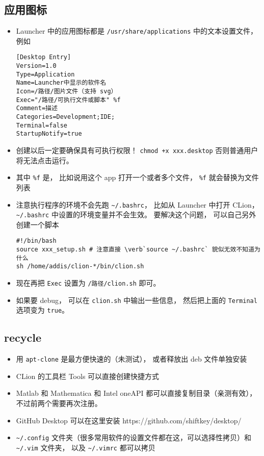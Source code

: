 \subsection{应用图标}
\begin{itemize}
\item Launcher 中的应用图标都是 \verb|/usr/share/applications| 中的文本设置文件， 例如
\begin{lstlisting}[language=none,caption=xxx.desktop]
[Desktop Entry]
Version=1.0
Type=Application
Name=Launcher中显示的软件名
Icon=/路径/图片文件（支持 svg）
Exec="/路径/可执行文件或脚本" %f
Comment=描述
Categories=Development;IDE;
Terminal=false
StartupNotify=true
\end{lstlisting}
\item 创建以后一定要确保具有可执行权限！ \verb|chmod +x xxx.desktop| 否则普通用户将无法点击运行。
\item 其中 \verb|%f| 是， 比如说用这个 app 打开一个或者多个文件， \verb|%f| 就会替换为文件列表
\item 注意执行程序的环境不会先跑 \verb|~/.bashrc|， 比如从 Launcher 中打开 CLion， \verb|~/.bashrc| 中设置的环境变量并不会生效。 要解决这个问题， 可以自己另外创建一个脚本
\begin{lstlisting}[language=none,caption=clion.sh]
#!/bin/bash
source xxx_setup.sh # 注意直接 \verb`source ~/.bashrc` 貌似无效不知道为什么
sh /home/addis/clion-*/bin/clion.sh
\end{lstlisting}
\item 现在再把 \verb|Exec| 设置为 \verb|/路径/clion.sh| 即可。
\item 如果要 debug， 可以在 \verb|clion.sh| 中输出一些信息， 然后把上面的 \verb|Terminal| 选项变为 \verb|true|。
\end{itemize}


\subsection{recycle}
\begin{itemize}
\item 用 \verb`apt-clone` 是最方便快速的（未测试）， 或者释放出 deb 文件单独安装
\item CLion 的工具栏 Tools 可以直接创建快捷方式
\item Matlab 和 Mathematica 和 Intel oneAPI 都可以直接复制目录（亲测有效）， 不过前两个需要再次注册。
\item GitHub Desktop 可以在这里安装 https://github.com/shiftkey/desktop/
\item \verb`~/.config` 文件夹（很多常用软件的设置文件都在这，可以选择性拷贝）和 \verb`~/.vim` 文件夹， 以及 \verb`~/.vimrc` 都可以拷贝
\end{itemize}
